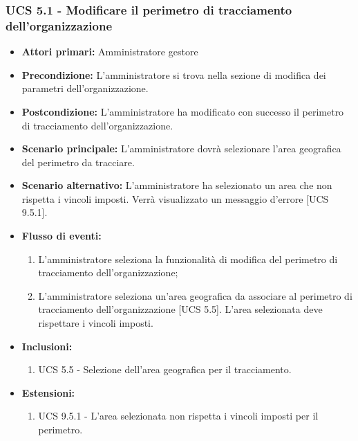 \subsubsection{UCS 5.1 - Modificare il perimetro di tracciamento dell'organizzazione}%
\begin{itemize}
    \item \textbf{Attori primari:} Amministratore gestore
    \item \textbf{Precondizione:} L'amministratore si trova nella sezione di modifica dei parametri dell'organizzazione.
    \item \textbf{Postcondizione:} L'amministratore ha modificato con successo il perimetro di tracciamento dell'organizzazione.
    \item \textbf{Scenario principale:} L'amministratore dovrà selezionare l'area geografica del perimetro da tracciare.
     \item \textbf{Scenario alternativo:} L'amministratore ha selezionato un area che non rispetta i vincoli imposti. Verrà visualizzato un messaggio d'errore [UCS 9.5.1].
    \item \textbf{Flusso di eventi:}
    \begin{enumerate}%
        \item L'amministratore seleziona la funzionalità di modifica del perimetro di tracciamento dell'organizzazione;
        \item L'amministratore seleziona un'area geografica da associare al perimetro di tracciamento dell'organizzazione [UCS 5.5]. L'area selezionata deve rispettare i vincoli imposti.
    \end{enumerate}
    \item \textbf{Inclusioni:}
    \begin{enumerate}
        \item UCS 5.5 - Selezione dell'area geografica per il tracciamento.
    \end{enumerate}
    \item \textbf{Estensioni:}
    \begin{enumerate}
        \item UCS 9.5.1 - L'area selezionata non rispetta i vincoli imposti per il perimetro.
    \end{enumerate}
\end{itemize}

